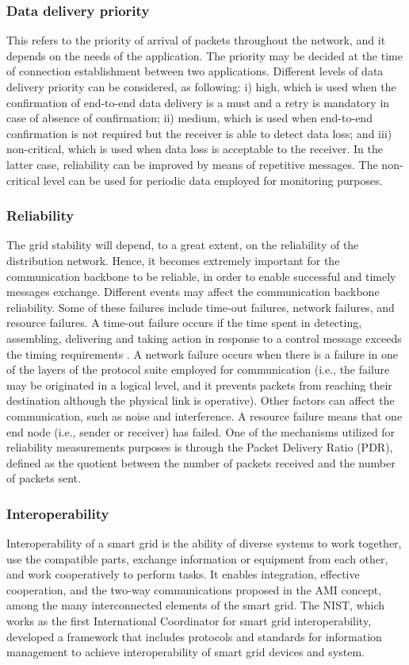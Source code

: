 \documentclass[10pt,twocolumn,twoside,submit]{JCNtran}
\begin{document}
\subsubsection{Data delivery priority}
This refers to the priority of arrival of packets throughout the network, and it depends on the needs of the application. The priority may be decided at the time of connection establishment between two applications. Different levels of data delivery priority can be considered, as following: i) high, which is used when the confirmation of end-to-end data delivery is a must and a retry is mandatory in case of absence of confirmation; ii) medium, which is used when end-to-end confirmation is not required but the receiver is able to detect data loss; and iii) non-critical, which is used when data loss is acceptable to the receiver. In the latter case, reliability can be improved by means of repetitive messages. The non-critical level can be used for periodic data employed for monitoring purposes. 

\subsubsection{Reliability}
The grid stability will depend, to a great extent, on the reliability of the distribution network. Hence, it becomes extremely important for the communication backbone to be reliable, in order to enable successful and timely messages exchange. Different events may affect the communication backbone reliability. Some of these failures include time-out failures, network failures, and resource failures. A time-out failure occurs if the time spent in detecting, assembling, delivering and taking action in response to a control message exceeds the timing requirements \cite{Wang2011a}.  A network failure occurs when there is a failure in one of the layers of the protocol suite employed for communication (i.e., the failure may be originated in a logical level, and it prevents packets from reaching their destination although the physical link is operative). Other factors can affect the communication, such as noise and interference. A resource failure means that one end node (i.e., sender or receiver) has failed. One of the mechanisms utilized for reliability measurements purposes is through the Packet Delivery Ratio (PDR), defined as the quotient between the number of packets received and the number of packets sent.

\subsubsection{Interoperability}
Interoperability of a smart grid is the ability of diverse systems to work together, use the compatible parts, exchange information or equipment from each other, and work cooperatively to perform tasks. It enables integration, effective cooperation, and the two-way communications proposed in the AMI concept, among the many interconnected elements of the smart grid. The NIST, which works as the first International Coordinator for smart grid interoperability, developed a framework that includes protocols and standards for information management to achieve interoperability of smart grid devices and system.
\end{document}
